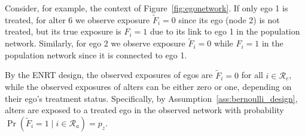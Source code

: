 \documentclass[11pt]{article}
\theoremstyle{definition}
\def \cR {\mathcal{R}}
\begin{document}
Consider, for example, the context of Figure~\ref{fig:egonetwork}.
If only ego 1 is treated, for alter 6 we observe exposure $\widetilde{F}_i=0$ since its ego (node 2) is not treated,
but its true exposure is $F_i=1$ due to its link to ego 1 in the population network. 
Similarly, for ego 2 we observe exposure $\widetilde{F}_i=0$ while $F_i=1$ in the population network
since it is connected to ego 1.

By the ENRT design, the observed exposures of egos are $\widetilde{F}_i =0$ for all $i \in \cR_e$,
while the observed exposures of alters can be either zero or one, depending on their ego's treatment status.
Specifically, by Assumption~\ref{ass:bernoulli_design}, alters are exposed to a treated ego in the observed network
with probability $\Pr(\widetilde{F}_i=1 \mid i \in \cR_a) = p_z$.
\end{document}

